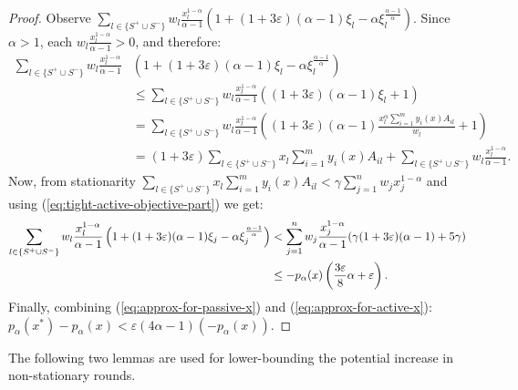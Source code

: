 \documentclass[11pt]{article}
\begin{document}
\begin{proof}
Observe $\sum_{l\in\{S^+\cup S^-\}} w_l\frac{x_l^{1-\alpha}}{\alpha-1}\left(1 + (1+3\varepsilon)(\alpha-1)\xi_l -\alpha\xi_l^{\frac{\alpha-1}{\alpha}} \right)$. Since $\alpha>1$, each $w_l\frac{x_l^{1-\alpha}}{\alpha-1}>0$, and therefore:
\begin{align*}
\sum_{l\in\{S^+\cup S^-\}} w_l\frac{x_l^{1-\alpha}}{\alpha-1} & \left(1 + (1+3\varepsilon)(\alpha-1)\xi_l -\alpha\xi_l^{\frac{\alpha-1}{\alpha}} \right)\\ 
&\leq \sum_{l\in\{S^+\cup S^-\}} w_l\frac{x_l^{1-\alpha}}{\alpha-1}\left((1+3\varepsilon)(\alpha-1)\xi_l + 1 \right)\\
&= \sum_{l\in\{S^+\cup S^-\}} w_l\frac{x_l^{1-\alpha}}{\alpha-1}\left((1+3\varepsilon)(\alpha-1)\frac{x_l^{\alpha}\sum_{i=1}^m y_i(x)A_{il}}{w_l} + 1 \right)\\
&= (1+3\varepsilon)\sum_{l\in\{S^+\cup S^-\}} x_l\sum_{i=1}^m y_i(x)A_{il} + \sum_{l\in\{S^+\cup S^-\}} w_l\frac{x_l^{1-\alpha}}{\alpha-1}.
\end{align*}
Now, from stationarity $\sum_{l\in\{S^+\cup S^-\}} x_l\sum_{i=1}^m y_i(x)A_{il}<\gamma \sum_{j=1}^n w_j x_j^{1-\alpha}$ and using (\ref{eq:tight-active-objective-part}) we get:
\begin{align}
\sum_{l\in\{S^+\cup S^-\}} w_l\frac{x_l^{1-\alpha}}{\alpha-1}\left(1 + (1+3\varepsilon)(\alpha-1)\xi_j -\alpha\xi_j^{\frac{\alpha-1}{\alpha}} \right)&< \sum_{j=1}^n w_j \frac{x_j^{1-\alpha}}{\alpha-1}(\gamma(1+3\varepsilon)(\alpha-1) + 5\gamma)\notag\\
&\leq -p_{\alpha}(x)\left(\frac{3\varepsilon}{8}\alpha +\varepsilon \right). \label{eq:approx-for-active-x}
\end{align}
Finally, combining (\ref{eq:approx-for-passive-x}) and (\ref{eq:approx-for-active-x}): 
$
p_\alpha(x^*) - p_\alpha(x) < \varepsilon(4\alpha - 1)(-p_{\alpha}(x)).
$
\end{proof}
The following two lemmas are used for lower-bounding the potential increase in non-stationary rounds.
\end{document}
